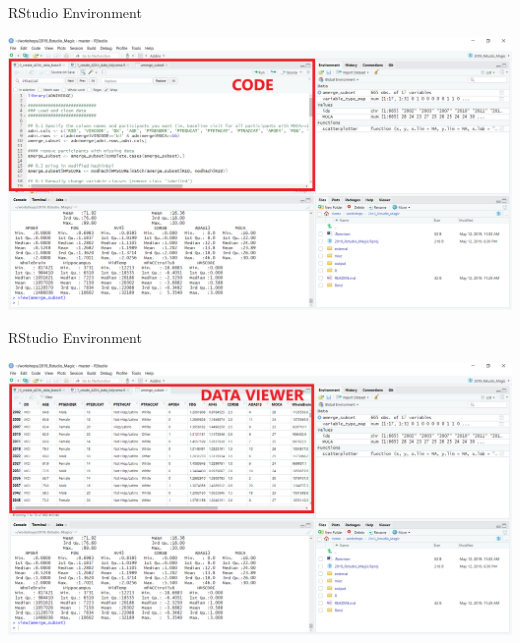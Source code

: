 \documentclass[
  ignorenonframetext,
]{beamer}
\begin{document}
\begin{frame}{RStudio Environment}
\protect\hypertarget{rstudio-environment-4}{}

\includegraphics{../external/images/rstudio_terminal_4_CODE.png}

\end{frame}

\begin{frame}{RStudio Environment}
\protect\hypertarget{rstudio-environment-5}{}

\includegraphics{../external/images/rstudio_terminal_5_DATA.png}

\end{frame}
\end{document}
